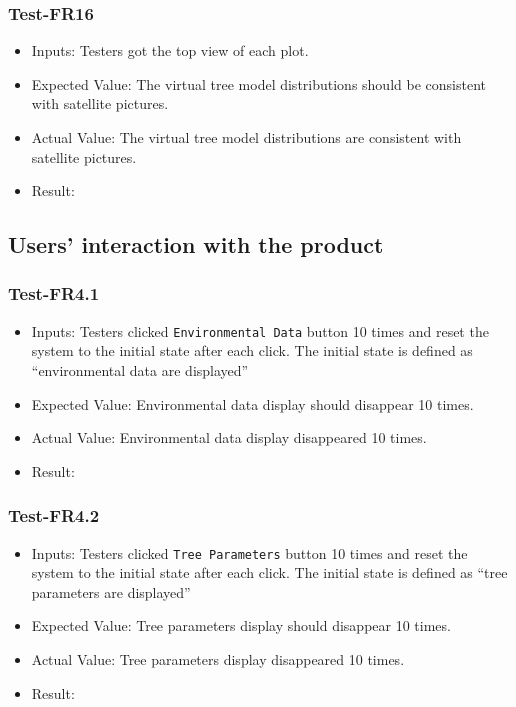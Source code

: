 \documentclass[12pt, titlepage]{article}
\begin{document}
\subsubsection{Test-FR16}
\begin{itemize}
\item Inputs: Testers got the top view of each plot. 
\item Expected Value: The virtual tree model distributions 
should be consistent with satellite pictures.
\item Actual Value:  The virtual tree model distributions are
consistent with satellite pictures.
\item Result: \pass
\end{itemize}

\subsection{Users' interaction with the product}
\subsubsection{Test-FR4.1}
\begin{itemize}
\item Inputs: Testers clicked \verb|Environmental Data| button 10 times 
and reset the system to the initial state after each click. The initial
state is defined as ``environmental data are displayed''
\item Expected Value: Environmental data display should disappear 10 times.
\item Actual Value: Environmental data display disappeared 10 times.
\item Result: \pass
\end{itemize}

\subsubsection{Test-FR4.2}
\begin{itemize}
\item Inputs: Testers clicked \verb|Tree Parameters| button 10 times
and reset  the system to the initial state after each click. The
initial state is defined as ``tree parameters are displayed''
\item Expected Value: Tree parameters display should disappear 10 times.
\item Actual Value: Tree parameters display disappeared 10 times.
\item Result: \pass
\end{itemize}
\end{document}
